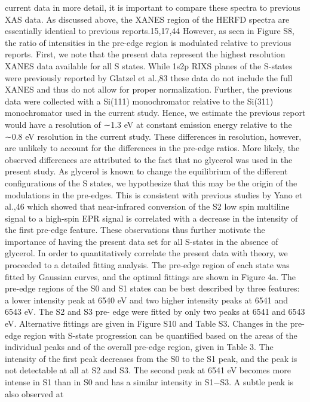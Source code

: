 \documentclass{article}
\begin{document}
current data in more detail, it is important to compare these
spectra to previous XAS data. As discussed above, the XANES
region of the HERFD spectra are essentially identical to
previous reports.15,17,44 However, as seen in Figure S8, the
ratio of intensities in the pre-edge region is modulated relative
to previous reports. First, we note that the present data
represent the highest resolution XANES data available for all S
states. While 1s2p RIXS planes of the S-states were previously
reported by Glatzel et al.,83 these data do not include the full
XANES and thus do not allow for proper normalization.
Further, the previous data were collected with a Si(111)
monochromator relative to the Si(311) monochromator used
in the current study. Hence, we estimate the previous report
would have a resolution of ∼1.3 eV at constant emission
energy relative to the ∼0.8 eV resolution in the current study.
These differences in resolution, however, are unlikely to
account for the differences in the pre-edge ratios. More likely,
the observed differences are attributed to the fact that no
glycerol was used in the present study. As glycerol is known to
change the equilibrium of the different configurations of the S
states, we hypothesize that this may be the origin of the
modulations in the pre-edges. This is consistent with previous
studies by Yano et al.,46 which showed that near-infrared
conversion of the S2 low spin multiline signal to a high-spin
EPR signal is correlated with a decrease in the intensity of the
first pre-edge feature. These observations thus further motivate
the importance of having the present data set for all S-states in
the absence of glycerol. In order to quantitatively correlate the
present data with theory, we proceeded to a detailed fitting
analysis.
The pre-edge region of each state was fitted by Gaussian
curves, and the optimal fittings are shown in Figure 4a. The
pre-edge regions of the S0 and S1 states can be best described
by three features: a lower intensity peak at 6540 eV and two
higher intensity peaks at 6541 and 6543 eV. The S2 and S3 pre-
edge were fitted by only two peaks at 6541 and 6543 eV.
Alternative fittings are given in Figure S10 and Table S3.
Changes in the pre-edge region with S-state progression can
be quantified based on the areas of the individual peaks and of
the overall pre-edge region, given in Table 3. The intensity of
the first peak decreases from the S0 to the S1 peak, and the
peak is not detectable at all at S2 and S3. The second peak at
6541 eV becomes more intense in S1 than in S0 and has a
similar intensity in S1−S3. A subtle peak is also observed at
\end{document}
